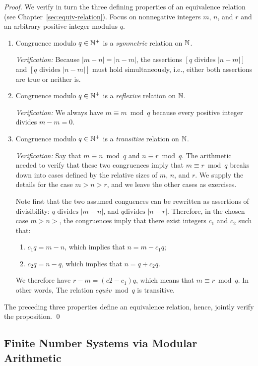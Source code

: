 \begin{proof}
We verify in turn the three defining properties of an equivalence
relation (see Chapter~\ref{sec:equiv-relation}).  Focus on nonnegative
integers $m$, $n$, and $r$ and an arbitrary positive integer modulus
$q$.

\begin{enumerate}
\item
Congruence modulo $q \in \mathbb{N}^+$ is a {\em symmetric} relation on $\mathbb{N}$.

{\it Verification:}
Because $|m-n| = |n-m|$, the assertions $[q \mbox{ divides } |n-m|]$
and $[q \mbox{ divides } |n-m|]$ must hold simultaneously, i.e.,
either both assertions are true or neither is.

\item
Congruence modulo $q \in \mathbb{N}^+$ is a {\em reflexive} relation on $\mathbb{N}$.

{\it Verification:}
We always have $m \equiv m \bmod q$ because every positive integer
divides $m-m = 0$.

\item
Congruence modulo $q \in \mathbb{N}^+$ is a {\em transitive} relation on $\mathbb{N}$.

{\it Verification:}
Say that $m \equiv n \bmod q$ and $n \equiv r \bmod q$.  The
arithmetic needed to verify that these two congruences imply that $m
\equiv r \bmod q$ breaks down into cases defined by the relative sizes
of $m$, $n$, and $r$.  We supply the details for the case $m > n > r$,
and we leave the other cases as exercises.

Note first that the two assumed conguences can be rewritten as
assertions of divisibility: $q \mbox{ divides } |m-n|$, and $q \mbox{
  divides } |n-r|$.  Therefore, in the chosen case $m > n > $, the
congruences imply that there exist integers $c_1$ and $c_2$ such that:
  \begin{enumerate}
  \item
$c_1 q = m-n$, which implies that $n = m - c_1 q$;
  \item
$c_2 q = n-q$, which implies that $n = q + c_2 q$.
  \end{enumerate}
We therefore have $r-m = (c2-c_1) q$, which means that $m \equiv r
\bmod q$.  In other words, The relation $equiv \bmod q$ is transitive.
\end{enumerate}
The preceding three properties define an equivalence relation, hence,
jointly verify the proposition.
\qed
\end{proof}

\subsection{Finite Number Systems via Modular Arithmetic}
\label{sec:modular}

